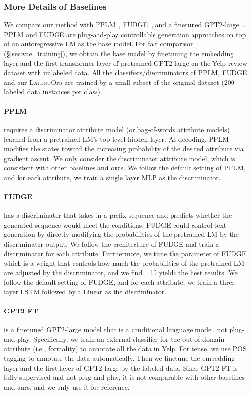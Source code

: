 \documentclass[11pt]{article}
\begin{document}
\subsubsection{More Details of Baselines}
\label{app:generation_baselines}
We compare our method with PPLM~\cite{Dathathri2020Plug}, FUDGE~\cite{DBLP:journals/corr/abs-2104-05218}, and a finetuned GPT2-large~\cite{gpt2}. PPLM and FUDGE are plug-and-play controllable generation approaches on top of an autoregressive LM as the base model. For fair comparison (\S\ref{sec:vae_training}), we obtain the base model by finetuning the embedding layer and the first transformer layer of pretrained GPT2-large on the Yelp review dataset with unlabeled data. All the classifiers/discriminators of PPLM, FUDGE and our \textsc{LatentOps} are trained by a small subset of the original dataset (200 labeled data instances per class). 
\paragraph{PPLM}  requires a discriminator attribute model (or bag-of-words attribute models) learned from a pretrained LM's top-level hidden layer. At decoding, PPLM modifies the states toward the increasing probability of the desired attribute via gradient ascent. We only consider the discriminator attribute model, which is consistent with other baselines and ours. We follow the default setting of PPLM, and for each attribute, we train a single layer MLP as the discriminator.  
\paragraph{FUDGE} has a discriminator that takes in a prefix sequence and predicts whether the generated sequence would meet the conditions. FUDGE could control text generation by directly modifying the probabilities of the pretrained LM by the discriminator output. 
We follow the architecture of FUDGE and train a discriminator for each attribute.
Furthermore, we tune the  parameter of FUDGE which is a weight that controls how much the probabilities of the pretrained LM are adjusted by the discriminator, and we find =10 yields the best results. We follow the default setting of FUDGE, and for each attribute, we train a three-layer LSTM followed by a Linear as the discriminator.
\paragraph{GPT2-FT} is a finetuned GPT2-large model that is a conditional language model, not plug-and-play. Specifically, we train an external classifier for the out-of-domain attribute (i.e., formality) to annotate all the data in Yelp. For tense, we use POS tagging to annotate the data automatically. Then we finetune the embedding layer and the first layer of GPT2-large by the labeled data. Since GPT2-FT is fully-supervised and not plug-and-play, it is not comparable with other baselines and ours, and we only use it for reference.
\end{document}
